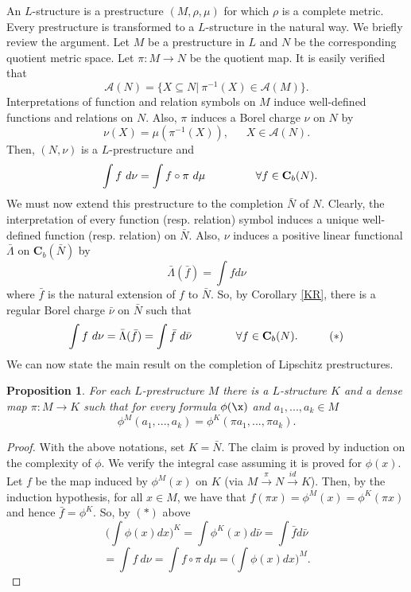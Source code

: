 \documentclass[12pt]{article}
\newtheorem{proposition}[theorem]{Proposition}
\begin{document}
An $L$-structure is a prestructure $(M,\rho,\mu)$ for which $\rho$ is a complete metric.
Every prestructure is transformed to a $L$-structure in the natural way.
We briefly review the argument. %
Let $M$ be a prestructure in $L$ and $N$ be the corresponding quotient metric space.
Let $\pi:M\rightarrow N$ be the quotient map. It is easily verified that
$$\mathcal A(N)=\{X\subseteq N|\ \pi^{-1}(X)\in\mathcal A(M)\}.$$
Interpretations of function and relation symbols on $M$ induce well-defined functions and relations on $N$.
Also, $\pi$ induces a Borel charge $\nu$ on
$N$ by
$$\nu(X)=\mu(\pi^{-1}(X)), \ \ \ \ \ \ \ X\in\mathcal A(N).$$
Then, $(N,\nu)$ is a $L$-prestructure and
$$\ \ \int f\ d\nu=\int f\circ\pi\ d\mu\hspace{16mm} \forall f\in\mathbf{C}_b(N).$$
We must now extend this prestructure to the completion $\bar{N}$ of $N$.
Clearly, the interpretation of every function (resp. relation) symbol induces
a unique well-defined function (resp. relation) on $\bar{N}$.
Also, $\nu$ induces a positive linear functional $\bar\Lambda$ on $\mathbf{C}_b(\bar{N})$ by $$\bar\Lambda(\bar f)=\int fd\nu$$
where $\bar{f}$ is the natural extension of $f$ to $\bar{N}$.
So, by Corollary \ref{KR}, there is a regular Borel charge $\bar\nu$ on $\bar{N}$
such that
$$\int f\ d\nu=\bar\Lambda(\bar f)=\int \bar f\ d\bar\nu\hspace{14mm} \forall f\in\mathbf{C}_b(N).\hspace{10mm}(*)$$
We can now state the main result on the completion of Lipschitz prestructures.

\begin{proposition}\label{exist1}
For each $L$-prestructure $M$ there is a $L$-structure $K$ and a dense map
$\pi:M\rightarrow K$ such that for every formula $\phi(\x)$ and $a_1,...,a_k\in M$
$$\phi^{M}(a_1,...,a_k)=\phi^{K}(\pi a_1,...,\pi a_k).$$
\end{proposition}
\begin{proof} With the above notations, set $K=\bar{N}$. The claim is proved by induction on the complexity of $\phi$.
We verify the integral case assuming it is proved for $\phi(x)$. Let $f$ be the map induced by $\phi^M(x)$ on $K$
(via $M\stackrel{\pi}{\rightarrow}N\stackrel{id}{\rightarrow}K$).
Then, by the induction hypothesis, for all $x\in M$, we have that $f(\pi x)=\phi^M(x)=\phi^{K}(\pi x)$
and hence $\bar f=\phi^{K}$. So, by $(*)$ above
$$\Big(\int\phi(x) dx\Big)^{K}=\int\phi^{K}(x)d\bar\nu=\int\bar{f}d\bar{\nu}$$
$$=\int f\ d\nu=\int f\circ\pi\ d\mu=\Big(\int\phi(x) dx\Big)^M.$$
\end{proof}
\end{document}

